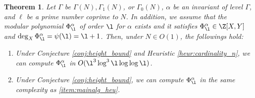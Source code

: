 \documentclass{amsart}
\newtheorem{theorem}{Theorem}[section]
\theoremstyle{definition}
\theoremstyle{remark}
\numberwithin{equation}{section}
\begin{document}
\begin{theorem}\label{thm:mainalg}
    Let $\Gamma$ be $\Gamma(N),\Gamma_1(N)$, or $\Gamma_0(N)$,  
    $\alpha$ be an invariant of level $\Gamma$, 
    and $\ell$ be a prime number coprime to $N$. 
    In addition, we assume that the modular polynomial $\Phi_{\l}^{\alpha}$ of order $\l$ for $\alpha$ exists and it satisfies 
    $\Phi_{\l}^{\alpha}\in \Z[X,Y]$ and $\deg_X\Phi_{\l}^{\alpha}=\psi(\l)=\l+1$. 
    Then, under $N\in O(1)$, the followings hold:
    \begin{enumerate}[leftmargin=2em]
        \item\label{item:mainalg_heu}
        Under Conjecture \ref{conj:height_bound} and Heuristic \ref{heur:cardinality_n}, 
        we can compute $\Phi_{\l}^{\alpha}$ in $O(\l^3\log^3 \l\log\log \l)$. 
        \item\label{item:mainalg}
        Under Conjecture \ref{conj:height_bound}, 
        we can compute $\Phi_{\l}^{\alpha}$ in the same complexity as \eqref{item:mainalg_heu}.
    \end{enumerate}
\end{theorem}
\end{document}
